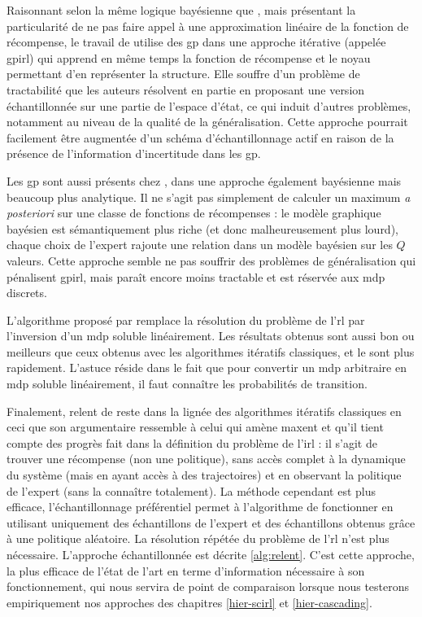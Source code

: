 \documentclass[frenchb,a4paper,justified,notoc]{tufte-book}
\begin{document}
   Raisonnant selon la même logique bayésienne que \citeauthor{ramachandran2007bayesian}, mais présentant la particularité de ne pas faire appel à une approximation linéaire de la fonction de récompense, le travail de \citet{levine2011nonlinear} utilise des \gls{gp} dans une approche itérative (appelée \gls{gpirl}) qui apprend en même temps la fonction de récompense et le noyau permettant d'en représenter la structure. Elle souffre d'un problème de tractabilité que les auteurs résolvent en partie en proposant une version échantillonnée sur une partie de l'espace d'état, ce qui induit d'autres problèmes, notamment au niveau de la qualité de la généralisation. Cette approche pourrait facilement être augmentée d'un schéma d'échantillonnage actif en raison de la présence de l'information d'incertitude dans les \gls{gp}.

   Les \gls{gp} sont aussi présents chez \citet{qiao2011inverse}, dans une approche également bayésienne mais beaucoup plus analytique. Il ne s'agit pas simplement de calculer un maximum \emph{a posteriori} sur une classe de fonctions de récompenses : le modèle graphique bayésien est sémantiquement plus riche (et donc malheureusement plus lourd), chaque choix de l'expert rajoute une relation dans un modèle bayésien sur les $Q$ valeurs. Cette approche semble ne pas souffrir des problèmes de généralisation qui pénalisent \gls{gpirl}, mais paraît encore moins tractable et est réservée aux \gls{mdp} discrets.

   L'algorithme proposé par \citet{dvijotham2010inverse} remplace la résolution du problème de l'\gls{rl} par l'inversion d'un \gls{mdp} soluble linéairement. Les résultats obtenus sont aussi bon ou meilleurs que ceux obtenus avec les algorithmes itératifs classiques, et le sont plus rapidement. L'astuce réside dans le fait que pour convertir un \gls{mdp} arbitraire en \gls{mdp} soluble linéairement, il faut connaître les probabilités de transition.

   Finalement, \gls{relent} de \citet{boularias2011relative} reste dans la lignée des algorithmes itératifs classiques en ceci que son argumentaire ressemble à celui qui amène \gls{maxent} et qu'il tient compte des progrès fait dans la définition du problème de l'\gls{irl} : il s'agit de trouver une récompense (non une politique), sans accès complet à la dynamique du système (mais en ayant accès à des trajectoires) et en observant la politique de l'expert (sans la connaître totalement). La méthode cependant est plus efficace, l'échantillonnage préférentiel permet à l'algorithme de fonctionner en utilisant uniquement des échantillons de l'expert et des échantillons obtenus grâce à une politique aléatoire. La résolution répétée du problème de l'\gls{rl} n'est plus nécessaire. L'approche échantillonnée est décrite \autoref{alg:relent}. C'est cette approche, la plus efficace de l'état de l'art en terme d'information nécessaire à son fonctionnement, qui nous servira de point de comparaison lorsque nous testerons empiriquement nos approches des chapitres \ref{hier-scirl} et \ref{hier-cascading}.
\end{document}
